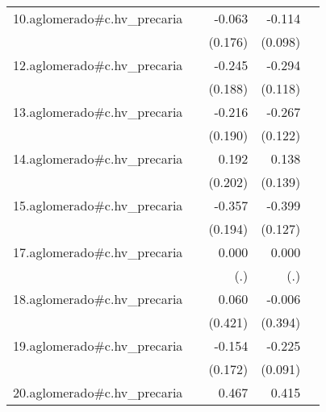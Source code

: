 {\begin{longtable}{l*{4}{D{.}{.}{-1}}}
\addlinespace
10.aglomerado#c.hv\_precaria&                     &      -0.063         &      -0.114         &                     \\
            &                     &     (0.176)         &     (0.098)         &                     \\
\addlinespace
12.aglomerado#c.hv\_precaria&                     &      -0.245         &      -0.294\sym{*}  &                     \\
            &                     &     (0.188)         &     (0.118)         &                     \\
\addlinespace
13.aglomerado#c.hv\_precaria&                     &      -0.216         &      -0.267\sym{*}  &                     \\
            &                     &     (0.190)         &     (0.122)         &                     \\
\addlinespace
14.aglomerado#c.hv\_precaria&                     &       0.192         &       0.138         &                     \\
            &                     &     (0.202)         &     (0.139)         &                     \\
\addlinespace
15.aglomerado#c.hv\_precaria&                     &      -0.357         &      -0.399\sym{**} &                     \\
            &                     &     (0.194)         &     (0.127)         &                     \\
\addlinespace
17.aglomerado#c.hv\_precaria&                     &       0.000         &       0.000         &                     \\
            &                     &         (.)         &         (.)         &                     \\
\addlinespace
18.aglomerado#c.hv\_precaria&                     &       0.060         &      -0.006         &                     \\
            &                     &     (0.421)         &     (0.394)         &                     \\
\addlinespace
19.aglomerado#c.hv\_precaria&                     &      -0.154         &      -0.225\sym{*}  &                     \\
            &                     &     (0.172)         &     (0.091)         &                     \\
\addlinespace
20.aglomerado#c.hv\_precaria&                     &       0.467         &       0.415         &                     \\

\end{longtable}}
